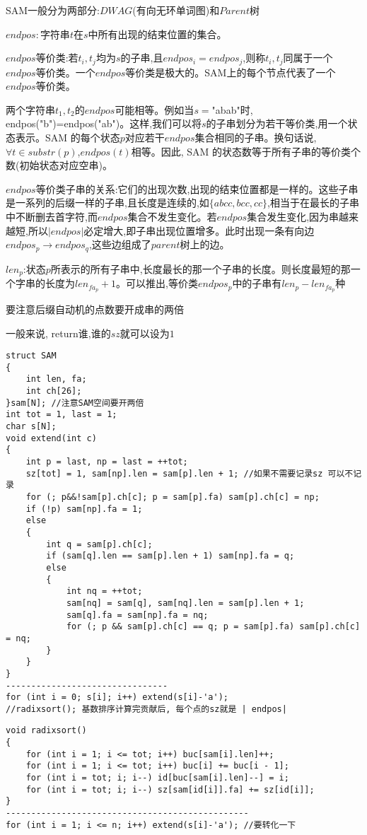 \documentclass[a4paper, fontset=none]{ctexart}
\begin{document}
SAM一般分为两部分:$DWAG$(有向无环单词图)和$Parent$树

$endpos:$字符串$t$在$s$中所有出现的结束位置的集合。

$endpos$等价类:若$t_i, t_j$均为$s$的子串,且$endpos_i=endpos_j$,则称$t_i, t_j$同属于一个$endpos$等价类。一个$endpos$等价类是极大的。SAM上的每个节点代表了一个$endpos$等价类。

两个字符串$t_1, t_2$的$endpos$可能相等。例如当$s=$"abab"时, endpos("b")=endpos("ab")。这样,我们可以将$s$的子串划分为若干等价类,用一个状态表示。SAM 的每个状态$p$对应若干$endpos$集合相同的子串。换句话说,$\forall t \in substr(p)$,$endpos(t)$相等。因此, SAM 的状态数等于所有子串的等价类个数(初始状态对应空串)。

$endpos$等价类子串的关系:它们的出现次数,出现的结束位置都是一样的。这些子串是一系列的后缀一样的子串,且长度是连续的,如$\{abcc, bcc, cc\}$,相当于在最长的子串中不断删去首字符,而$endpos$集合不发生变化。若$endpos$集合发生变化,因为串越来越短,所以$|endpos|$必定增大,即子串出现位置增多。此时出现一条有向边$endpos_p\rightarrow endpos_q$,这些边组成了$parent$树上的边。

$len_p$:状态$p$所表示的所有子串中,长度最长的那一个子串的长度。则长度最短的那一个字串的长度为$len_{fa_p}+1$。可以推出,等价类$endpos_p$中的子串有$len_p-len_{fa_p}$种

要注意后缀自动机的点数要开成串的两倍

一般来说, return谁,谁的$sz$就可以设为$1$

\begin{verbatim}
struct SAM
{
    int len, fa;
    int ch[26];
}sam[N]; //注意SAM空间要开两倍
int tot = 1, last = 1;
char s[N];
void extend(int c)
{
    int p = last, np = last = ++tot;
    sz[tot] = 1, sam[np].len = sam[p].len + 1; //如果不需要记录sz 可以不记录
    for (; p&&!sam[p].ch[c]; p = sam[p].fa) sam[p].ch[c] = np;
    if (!p) sam[np].fa = 1;
    else
    {
        int q = sam[p].ch[c];
        if (sam[q].len == sam[p].len + 1) sam[np].fa = q;
        else
        {
            int nq = ++tot;
            sam[nq] = sam[q], sam[nq].len = sam[p].len + 1;
            sam[q].fa = sam[np].fa = nq;
            for (; p && sam[p].ch[c] == q; p = sam[p].fa) sam[p].ch[c] = nq;
        }
    }
}
--------------------------------
for (int i = 0; s[i]; i++) extend(s[i]-'a');
//radixsort(); 基数排序计算完贡献后, 每个点的sz就是 | endpos|
\end{verbatim}

\begin{verbatim}
void radixsort()
{
    for (int i = 1; i <= tot; i++) buc[sam[i].len]++;
    for (int i = 1; i <= tot; i++) buc[i] += buc[i - 1];
    for (int i = tot; i; i--) id[buc[sam[i].len]--] = i;
    for (int i = tot; i; i--) sz[sam[id[i]].fa] += sz[id[i]];
}
------------------------------------------------
for (int i = 1; i <= n; i++) extend(s[i]-'a'); //要转化一下
\end{verbatim}
\end{document}
